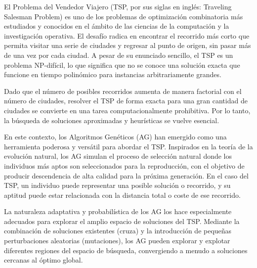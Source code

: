 El Problema del Vendedor Viajero (TSP, por sus siglas en inglés: Traveling Salesman Problem) es uno de los problemas de optimización combinatoria más estudiados y conocidos en el ámbito de las ciencias de la computación y la investigación operativa. El desafío radica en encontrar el recorrido más corto que permita visitar una serie de ciudades y regresar al punto de origen, sin pasar más de una vez por cada ciudad. A pesar de su enunciado sencillo, el TSP es un problema NP-difícil, lo que significa que no se conoce una solución exacta que funcione en tiempo polinómico para instancias arbitrariamente grandes.

Dado que el número de posibles recorridos aumenta de manera factorial con el número de ciudades, resolver el TSP de forma exacta para una gran cantidad de ciudades se convierte en una tarea computacionalmente prohibitiva. Por lo tanto, la búsqueda de soluciones aproximadas y heurísticas se vuelve esencial.

En este contexto, los Algoritmos Genéticos (AG) han emergido como una herramienta poderosa y versátil para abordar el TSP. Inspirados en la teoría de la evolución natural, los AG simulan el proceso de selección natural donde los individuos más aptos son seleccionados para la reproducción, con el objetivo de producir descendencia de alta calidad para la próxima generación. En el caso del TSP, un individuo puede representar una posible solución o recorrido, y su aptitud puede estar relacionada con la distancia total o coste de ese recorrido.

La naturaleza adaptativa y probabilística de los AG los hace especialmente adecuados para explorar el amplio espacio de soluciones del TSP. Mediante la combinación de soluciones existentes (cruza) y la introducción de pequeñas perturbaciones aleatorias (mutaciones), los AG pueden explorar y explotar diferentes regiones del espacio de búsqueda, convergiendo a menudo a soluciones cercanas al óptimo global.
